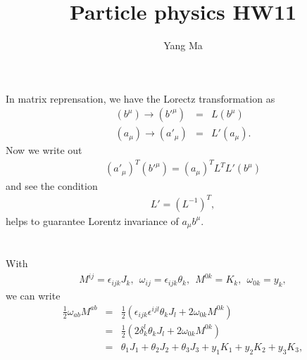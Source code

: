 \documentclass[11pt]{article}
\begin{document}
\title{Particle physics HW11}
\author{Yang Ma}

\maketitle

\section{ }
In matrix reprensation, we have the Lorectz transformation as
\begin{eqnarray}
    (b^\mu) \to ({b'}^\mu) &=&      L     (b^\mu) \\
    (a_\mu) \to ({a'}_\mu) &=& L' (a_\mu).
\end{eqnarray}
Now we write out
\begin{eqnarray}
    (a'_\mu)^T (b'^\mu) =  (a_\mu)^T L^T  L' (b^\mu)
\end{eqnarray}
and see the condition
\begin{eqnarray}
    L'=(L^{-1})^T,
\end{eqnarray}
helps to guarantee Lorentz invariance of $a_\mu b^\mu$.

\section{ }
With
\begin{eqnarray}
    M^{ij} = \epsilon_{ijk} J_k,  ~~ \omega_{ij} = \epsilon_{ijk} \theta_k, ~~ M^{0k} = K_k,  ~~              \omega_{0k} = y_k, 
  \end{eqnarray}
we can write
\begin{eqnarray}
    \frac{1}{2} \omega_{ab} M^{ab}
    &=&  \frac{1}{2} (\epsilon_{ijk}\epsilon^{ijl}\theta_k J_l + 2\omega_{0k} M^{0k})\\
    &=&  \frac{1}{2} (2\delta^l_k \theta_k J_l + 2\omega_{0k} M^{0k})\\
    &=& \theta_1 J_1  +\theta_2 J_2  +\theta_3 J_3  +y_1 K_1  +y_2  K_2  +y_3  K_3, 
\end{eqnarray}
    
\end{document}
